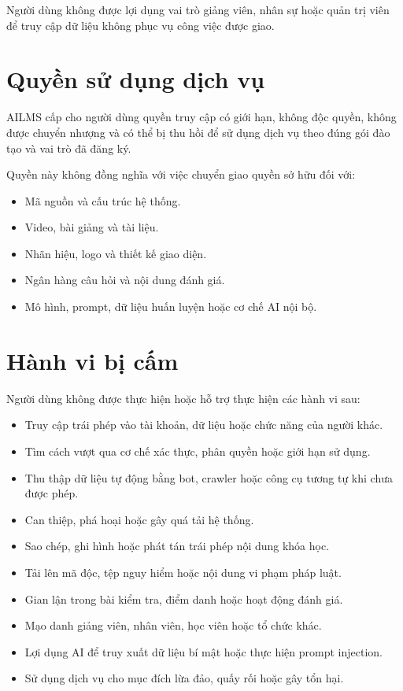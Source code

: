 \documentclass[12pt,a4paper]{article}
\begin{document}
Người dùng không được lợi dụng vai trò giảng viên, nhân sự hoặc quản trị viên
để truy cập dữ liệu không phục vụ công việc được giao.

\section{Quyền sử dụng dịch vụ}

AILMS cấp cho người dùng quyền truy cập có giới hạn, không độc quyền,
không được chuyển nhượng và có thể bị thu hồi để sử dụng dịch vụ
theo đúng gói đào tạo và vai trò đã đăng ký.

Quyền này không đồng nghĩa với việc chuyển giao quyền sở hữu đối với:

\begin{itemize}
    \item Mã nguồn và cấu trúc hệ thống.
    \item Video, bài giảng và tài liệu.
    \item Nhãn hiệu, logo và thiết kế giao diện.
    \item Ngân hàng câu hỏi và nội dung đánh giá.
    \item Mô hình, prompt, dữ liệu huấn luyện hoặc cơ chế AI nội bộ.
\end{itemize}

\section{Hành vi bị cấm}

Người dùng không được thực hiện hoặc hỗ trợ thực hiện các hành vi sau:

\begin{itemize}
    \item Truy cập trái phép vào tài khoản, dữ liệu hoặc chức năng của người khác.
    \item Tìm cách vượt qua cơ chế xác thực, phân quyền hoặc giới hạn sử dụng.
    \item Thu thập dữ liệu tự động bằng bot, crawler hoặc công cụ tương tự khi chưa được phép.
    \item Can thiệp, phá hoại hoặc gây quá tải hệ thống.
    \item Sao chép, ghi hình hoặc phát tán trái phép nội dung khóa học.
    \item Tải lên mã độc, tệp nguy hiểm hoặc nội dung vi phạm pháp luật.
    \item Gian lận trong bài kiểm tra, điểm danh hoặc hoạt động đánh giá.
    \item Mạo danh giảng viên, nhân viên, học viên hoặc tổ chức khác.
    \item Lợi dụng AI để truy xuất dữ liệu bí mật hoặc thực hiện prompt injection.
    \item Sử dụng dịch vụ cho mục đích lừa đảo, quấy rối hoặc gây tổn hại.
\end{itemize}
\end{document}
